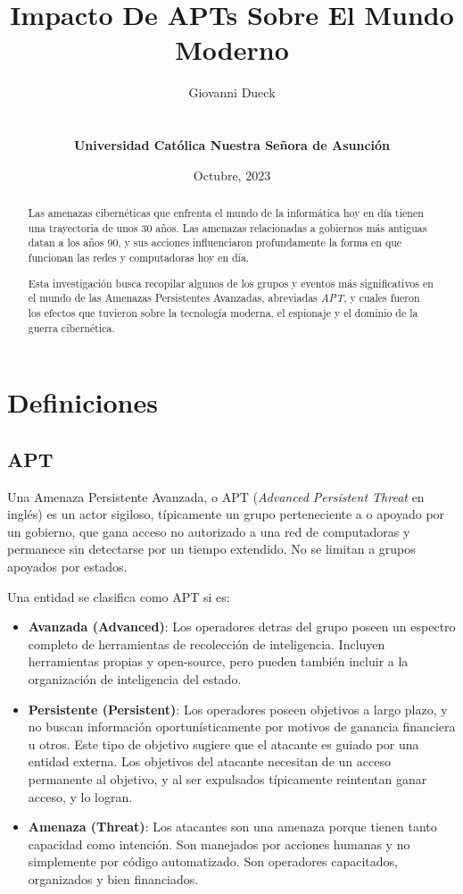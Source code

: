 \documentclass{article}
\title{Impacto De APTs Sobre El Mundo Moderno}
\author{Giovanni Dueck\\\UrlFont{giodueck@gmail.com}\\\\{\bf Universidad Católica Nuestra Señora de Asunción}}
\date{Octubre, 2023}
\begin{document}
\maketitle

\begin{abstract}

Las amenazas cibernéticas que enfrenta el mundo de la informática hoy en día tienen una trayectoria de unos 30 años. Las amenazas relacionadas a gobiernos más antiguas datan a los años 90, y sus acciones influenciaron profundamente la forma en que funcionan las redes y computadoras hoy en día.

Esta investigación busca recopilar algunos de los grupos y eventos más significativos en el mundo de las Amenazas Persistentes Avanzadas, abreviadas {\it APT}, y cuales fueron los efectos que tuvieron sobre la tecnología moderna, el espionaje y el dominio de la guerra cibernética.

\end{abstract}

\section{Definiciones}
\subsection{APT}
Una Amenaza Persistente Avanzada, o APT ({\it Advanced Persistent Threat} en inglés) es un actor sigiloso, típicamente un grupo perteneciente a o apoyado por un gobierno, que gana acceso no autorizado a una red de computadoras y permanece sin detectarse por un tiempo extendido. No se limitan a grupos apoyados por estados. \autocite{cybereason-apt} 

Una entidad se clasifica como APT si es:
\begin{itemize}
    \item {\bf Avanzada (Advanced)}: Los operadores detras del grupo poseen un espectro completo de herramientas de recolección de inteligencia. Incluyen herramientas propias y open-source, pero pueden también incluir a la organización de inteligencia del estado.
    \item {\bf Persistente (Persistent)}: Los operadores poseen objetivos a largo plazo, y no buscan información oportunísticamente por motivos de ganancia financiera u otros. Este tipo de objetivo sugiere que el atacante es guiado por una entidad externa. Los objetivos del atacante necesitan de un acceso permanente al objetivo, y al ser expulsados típicamente reintentan ganar acceso, y lo logran.
    \item {\bf Amenaza (Threat)}: Los atacantes son una amenaza porque tienen tanto capacidad como intención. Son manejados por acciones humanas y no simplemente por código automatizado. Son operadores capacitados, organizados y bien financiados. \autocite{itgov-apt}
\end{itemize}
\end{document}
